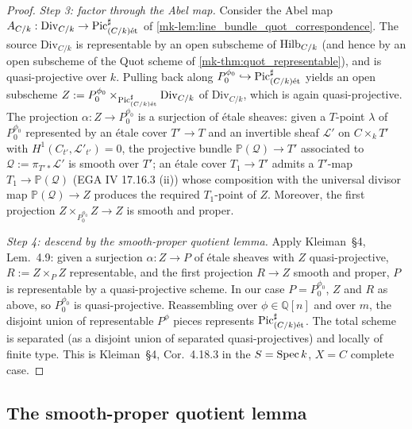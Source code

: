 \begin{proof}
  \emph{Step 3: factor through the Abel map.}
  Consider the Abel map \(A_{C/k} : \mathrm{Div}_{C/k} \to \operatorname{Pic}^\sharp_{(C/k)\mathrm{\acute{e}t}}\)
  of \ref{mk-lem:line_bundle_quot_correspondence}. The source \(\mathrm{Div}_{C/k}\)
  is representable by an open subscheme of \(\operatorname{Hilb}_{C/k}\) (and hence by an
  open subscheme of the Quot scheme of \ref{mk-thm:quot_representable}), and
  is quasi-projective over \(k\). Pulling back along
  \(P^{\phi_0}_0 \hookrightarrow \operatorname{Pic}^\sharp_{(C/k)\mathrm{\acute{e}t}}\) yields an open
  subscheme \(Z := P^{\phi_0}_0 \times_{\operatorname{Pic}^\sharp_{(C/k)\mathrm{\acute{e}t}}} \mathrm{Div}_{C/k}\)
  of \(\mathrm{Div}_{C/k}\), which is again quasi-projective. The projection
  \(\alpha : Z \to P^{\phi_0}_0\) is a surjection of \'etale sheaves:
  given a \(T\)-point \(\lambda\) of \(P^{\phi_0}_0\) represented by an \'etale
  cover \(T' \to T\) and an invertible sheaf \(\mathcal{L}'\) on \(C \times_k
  T'\) with \(H^1(C_{t'}, \mathcal{L}'_{t'}) = 0\), the projective bundle
  \(\mathbb{P}(\mathcal{Q}) \to T'\) associated to
  \(\mathcal{Q} := \pi_{T'*}\mathcal{L}'\) is smooth over \(T'\); an \'etale
  cover \(T_1 \to T'\) admits a \(T'\)-map \(T_1 \to \mathbb{P}(\mathcal{Q})\)
  (EGA IV 17.16.3 (ii)) whose composition with the universal divisor map
  \(\mathbb{P}(\mathcal{Q}) \to Z\) produces the required \(T_1\)-point of \(Z\).
  Moreover, the first projection \(Z \times_{P^{\phi_0}_0} Z \to Z\) is
  smooth and proper.

  \emph{Step 4: descend by the smooth-proper quotient lemma.}
  Apply Kleiman~\S 4, Lem.~4.9: given a surjection \(\alpha : Z \to P\)
  of \'etale sheaves with \(Z\) quasi-projective, \(R := Z \times_P Z\)
  representable, and the first projection \(R \to Z\) smooth and proper,
  \(P\) is representable by a quasi-projective scheme. In our case
  \(P = P^{\phi_0}_0\), \(Z\) and \(R\) as above, so \(P^{\phi_0}_0\) is
  quasi-projective. Reassembling over \(\phi \in \mathbb{Q}[n]\) and
  over \(m\), the disjoint union of representable \(P^\phi\) pieces represents
  \(\operatorname{Pic}^\sharp_{(C/k)\mathrm{\acute{e}t}}\). The total scheme is separated (as a disjoint
  union of separated quasi-projectives) and locally of finite type. This
  is Kleiman~\S 4, Cor.~4.18.3 in the \(S = \operatorname{Spec} k\),
  \(X = C\) complete case.
\end{proof}

\subsection{The smooth-proper quotient lemma}
\label{mk-subsec:fga_pic_qt}

